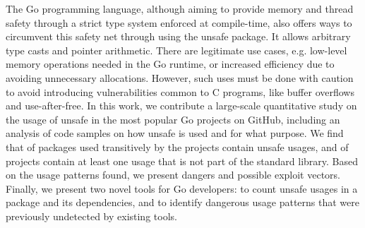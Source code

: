 The Go programming language, although aiming to provide memory and thread safety through a strict type system enforced at compile-time, also offers ways to circumvent this safety net through using the unsafe package.
It allows arbitrary type casts and pointer arithmetic.
There are legitimate use cases, e.g. low-level memory operations needed in the Go runtime, or increased efficiency due to avoiding unnecessary allocations.
However, such uses must be done with caution to avoid introducing vulnerabilities common to C programs, like buffer overflows and use-after-free.
In this work, we contribute a large-scale quantitative study on the usage of unsafe in the \projsAnalyzed{} most popular Go projects on GitHub, including an analysis of  code samples on how unsafe is used and for what purpose.
We find that  of packages used transitively by the projects contain unsafe usages, and  of projects contain at least one usage that is not part of the standard library.
Based on the usage patterns found, we present dangers and possible exploit vectors.
Finally, we present two novel tools for Go developers: \toolUsage{} to count unsafe usages in a package and its dependencies, and \toolSA{} to identify dangerous usage patterns that were previously undetected by existing tools.